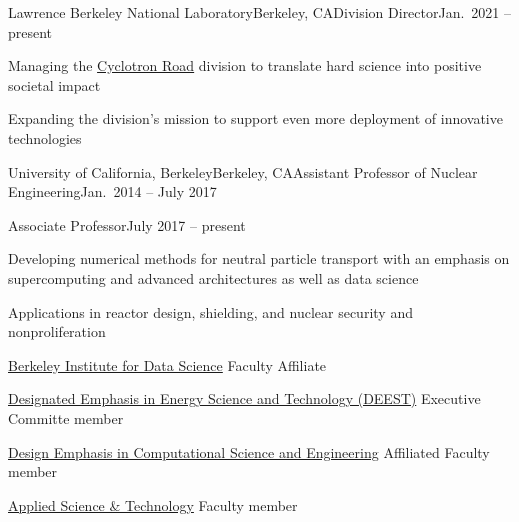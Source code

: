 \begin{rSubsection}{Lawrence Berkeley National Laboratory}{Berkeley,
CA}{Division Director}{Jan.\ 2021 -- present}
\item Managing the \href{https://www.cyclotronroad.org/}{Cyclotron Road} division to translate hard science into positive societal impact
\item Expanding the division’s mission to support even more deployment of innovative technologies
\end{rSubsection}


\begin{rSubsection}{University of California, Berkeley}{Berkeley, CA}{Assistant
Professor of Nuclear Engineering}{Jan.\ 2014 -- July 2017}
\end{rSubsection}
\vspace*{-2 em}
\begin{rSubsection}{}{}{Associate Professor}{July 2017 -- present}
\item Developing numerical methods for neutral particle transport with an emphasis on supercomputing and advanced architectures as well as data science
\item Applications in reactor design, shielding, and nuclear security and nonproliferation
\item \href{http://bids.berkeley.edu/}{Berkeley Institute for Data Science}
Faculty Affiliate
\item \href{https://me.berkeley.edu/graduate/special-programs/deest/}{Designated
Emphasis in Energy Science and Technology (DEEST)} Executive Committe member
\item \href{http://citris-uc.org/decse-mission/}{Design Emphasis in Computational Science and Engineering} Affiliated Faculty member
\item \href{http://ast.coe.berkeley.edu/}{Applied Science \& Technology} Faculty member
\end{rSubsection}


